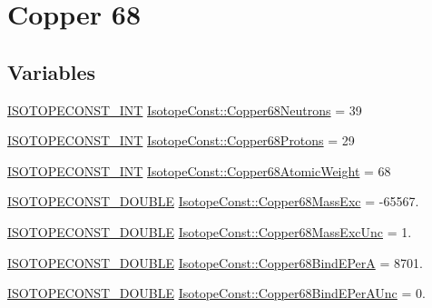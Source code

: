 \hypertarget{group___isotope_const-_copper-_cu68}{}\section{Copper 68}
\label{group___isotope_const-_copper-_cu68}
\subsection*{Variables}
\begin{DoxyCompactItemize}
\item 
\mbox{\hyperlink{group___isotope_const-_macros_ga5f18360b3e99483a35c32d789e62621c}{I\+S\+O\+T\+O\+P\+E\+C\+O\+N\+S\+T\+\_\+\+I\+NT}} \mbox{\hyperlink{group___isotope_const-_copper-_cu68_gaccfd1a8d5931061edc3609d51a0ab989}{Isotope\+Const\+::\+Copper68\+Neutrons}} = 39
\item 
\mbox{\hyperlink{group___isotope_const-_macros_ga5f18360b3e99483a35c32d789e62621c}{I\+S\+O\+T\+O\+P\+E\+C\+O\+N\+S\+T\+\_\+\+I\+NT}} \mbox{\hyperlink{group___isotope_const-_copper-_cu68_gad04faa3fa5b20b88d2f0141c02b74e4e}{Isotope\+Const\+::\+Copper68\+Protons}} = 29
\item 
\mbox{\hyperlink{group___isotope_const-_macros_ga5f18360b3e99483a35c32d789e62621c}{I\+S\+O\+T\+O\+P\+E\+C\+O\+N\+S\+T\+\_\+\+I\+NT}} \mbox{\hyperlink{group___isotope_const-_copper-_cu68_ga24cad10d692c0861703684aed941128d}{Isotope\+Const\+::\+Copper68\+Atomic\+Weight}} = 68
\item 
\mbox{\hyperlink{group___isotope_const-_macros_ga8f45a7272ce02c0b4c65c44636ed719a}{I\+S\+O\+T\+O\+P\+E\+C\+O\+N\+S\+T\+\_\+\+D\+O\+U\+B\+LE}} \mbox{\hyperlink{group___isotope_const-_copper-_cu68_gac6274d90ee75ad24d5b6bc9602534929}{Isotope\+Const\+::\+Copper68\+Mass\+Exc}} = -\/65567.
\item 
\mbox{\hyperlink{group___isotope_const-_macros_ga8f45a7272ce02c0b4c65c44636ed719a}{I\+S\+O\+T\+O\+P\+E\+C\+O\+N\+S\+T\+\_\+\+D\+O\+U\+B\+LE}} \mbox{\hyperlink{group___isotope_const-_copper-_cu68_ga8b1440769e43ace1d7957c9c24912a16}{Isotope\+Const\+::\+Copper68\+Mass\+Exc\+Unc}} = 1.
\item 
\mbox{\hyperlink{group___isotope_const-_macros_ga8f45a7272ce02c0b4c65c44636ed719a}{I\+S\+O\+T\+O\+P\+E\+C\+O\+N\+S\+T\+\_\+\+D\+O\+U\+B\+LE}} \mbox{\hyperlink{group___isotope_const-_copper-_cu68_ga264099c0671fe227466020e98b708ee6}{Isotope\+Const\+::\+Copper68\+Bind\+E\+PerA}} = 8701.
\item 
\mbox{\hyperlink{group___isotope_const-_macros_ga8f45a7272ce02c0b4c65c44636ed719a}{I\+S\+O\+T\+O\+P\+E\+C\+O\+N\+S\+T\+\_\+\+D\+O\+U\+B\+LE}} \mbox{\hyperlink{group___isotope_const-_copper-_cu68_ga050520e586697e1f1bf8c8180fd5159b}{Isotope\+Const\+::\+Copper68\+Bind\+E\+Per\+A\+Unc}} = 0.

\end{DoxyCompactItemize}
